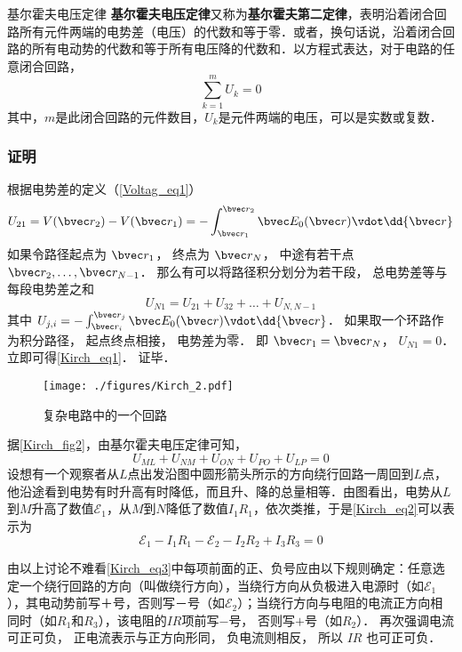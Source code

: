 \begin{theorem}{基尔霍夫电压定律}
\textbf{基尔霍夫电压定律}又称为\textbf{基尔霍夫第二定律}，表明沿着闭合回路所有元件两端的电势差（电压）的代数和等于零．或者，换句话说，沿着闭合回路的所有电动势的代数和等于所有电压降的代数和．以方程式表达，对于电路的任意闭合回路，
\begin{equation}\label{Kirch_eq1}
\sum_{k=1}^m U_k = 0
\end{equation}
其中，$m$是此闭合回路的元件数目，$U_k$是元件两端的电压，可以是实数或复数．
\end{theorem}

\subsubsection{证明}
根据电势差的定义（\autoref{Voltag_eq1}）
\begin{equation}
U_{21} = V(\bvec r_2) - V(\bvec r_1) = - \int_{\bvec r_1}^{\bvec r_2} \bvec E_0(\bvec r) \vdot \dd{\bvec r}
\end{equation}
如果令路径起点为 $\bvec r_1$， 终点为 $\bvec r_N$， 中途有若干点 $\bvec r_2, \dots, \bvec r_{N-1}$． 那么有可以将路径积分划分为若干段， 总电势差等与每段电势差之和
\begin{equation}
U_{N1} = U_{21} + U_{32} + \dots + U_{N, N-1}
\end{equation}
其中 $U_{j, i} = - \int_{\bvec r_i}^{\bvec r_{j}} \bvec E_0(\bvec r) \vdot \dd{\bvec r}$．
如果取一个环路作为积分路径， 起点终点相接， 电势差为零． 即 $\bvec r_1 = \bvec r_N$， $U_{N1} = 0$． 立即可得\autoref{Kirch_eq1}． 证毕．

\begin{example}{}
\begin{figure}[ht]
\centering
\texttt{[image: ./figures/Kirch\_2.pdf]}
\caption{复杂电路中的一个回路} \label{Kirch_fig2}
\end{figure}

据\autoref{Kirch_fig2}，由基尔霍夫电压定律可知，
\begin{equation} \label{Kirch_eq2}
U_{M L}+U_{N M}+U_{O N}+U_{P O}+U_{L P}=0
\end{equation}
设想有一个观察者从$L$点出发沿图中圆形箭头所示的方向绕行回路一周回到$L $点，他沿途看到电势有时升高有时降低，而且升、降的总量相等．由图看出，电势从$L $到$M $升高了数值$\mathscr E_1$，从$M $到$N $降低了数值$I_1R_1$，依次类推，于是\autoref{Kirch_eq2}可以表示为
\begin{equation}\label{Kirch_eq3}
\mathscr{E}_{1}-I_{1} R_{1}-\mathscr{E}_{2}-I_{2} R_{2}+I_{3} R_{3}=0
\end{equation}

由以上讨论不难看\autoref{Kirch_eq3}中每项前面的正、负号应由以下规则确定：任意选定一个绕行回路的方向（叫做绕行方向），当绕行方向从负极进入电源时（如$\mathscr E_1$），其电动势前写$＋$号，否则写$－$号（如$\mathscr
E_2$）；当绕行方向与电阻的电流正方向相同时（如$R_1$和$R_3$），该电阻的$IR$项前写$-$号， 否则写$+$号（如$R_2$）． 再次强调电流可正可负， 正电流表示与正方向形同， 负电流则相反， 所以 $IR$ 也可正可负．
\end{example}


